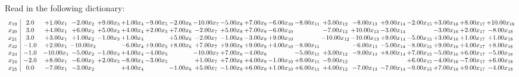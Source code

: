 \documentclass[9pt]{article}
\begin{document}
Read in the following dictionary:
\[\begin{array}{c| c c@{\hskip 2pt} c@{\hskip 2pt} c@{\hskip 2pt} c@{\hskip 2pt} c@{\hskip 2pt} c@{\hskip 2pt} c@{\hskip 2pt} c@{\hskip 2pt} c@{\hskip 2pt} c@{\hskip 2pt} c@{\hskip 2pt} c@{\hskip 2pt} c@{\hskip 2pt} c@{\hskip 2pt} c@{\hskip 2pt} c@{\hskip 2pt} c@{\hskip 2pt} c@{\hskip 2pt} }
 x_{19}   &  2.0 & +  1.00 x_{1} & -2.00 x_{2} & +  9.00 x_{3} & +  1.00 x_{4} & -9.00 x_{5} & -2.00 x_{6} & -10.00 x_{7} & -5.00 x_{8} & +  7.00 x_{9} & -6.00 x_{10} & -8.00 x_{11} & +  3.00 x_{12} & -8.00 x_{13} & +  9.00 x_{14} & -2.00 x_{15} & +  3.00 x_{16} & +  8.00 x_{17} & + 10.00 x_{18}\\
 x_{20}   &  3.0 & +  4.00 x_{1} & +  6.00 x_{2} & +  5.00 x_{3} & +  4.00 x_{4} & +  2.00 x_{5} & +  7.00 x_{6} & -2.00 x_{7} & +  5.00 x_{8} & +  7.00 x_{9} & -6.00 x_{10} &   & -7.00 x_{12} & + 10.00 x_{13} & -3.00 x_{14} &   & -3.00 x_{16} & +  2.00 x_{17} & -8.00 x_{18}\\
 x_{21}   &  3.0 & +  3.00 x_{1} & +  1.00 x_{2} & -1.00 x_{3} & +  1.00 x_{4} &   & +  5.00 x_{6} & -2.00 x_{7} & -1.00 x_{8} & -3.00 x_{9} & +  9.00 x_{10} &   & -10.00 x_{12} & -10.00 x_{13} & +  9.00 x_{14} & -5.00 x_{15} & +  3.00 x_{16} & +  1.00 x_{17} & +  1.00 x_{18}\\
 x_{22}   &  -1.0 & +  2.00 x_{1} & -10.00 x_{2} &   & -6.00 x_{4} & +  9.00 x_{5} & +  8.00 x_{6} & +  7.00 x_{7} & +  9.00 x_{8} & +  9.00 x_{9} & +  4.00 x_{10} & -8.00 x_{11} &   & -6.00 x_{13} & -5.00 x_{14} & -8.00 x_{15} & +  9.00 x_{16} & +  4.00 x_{17} & +  8.00 x_{18}\\
 x_{23}   &  -1.0 & -10.00 x_{1} & -5.00 x_{2} & -1.00 x_{3} & +  4.00 x_{4} & -4.00 x_{5} &   & -10.00 x_{7} & +  7.00 x_{8} & -4.00 x_{9} &   & -5.00 x_{11} & +  3.00 x_{12} & -9.00 x_{13} & +  8.00 x_{14} & +  7.00 x_{15} & -5.00 x_{16} & +  6.00 x_{17} & -5.00 x_{18}\\
 x_{24}   &  -2.0 & +  8.00 x_{1} & -6.00 x_{2} & +  2.00 x_{3} & -8.00 x_{4} & -3.00 x_{5} &   & +  1.00 x_{7} & +  7.00 x_{8} & +  4.00 x_{9} & -1.00 x_{10} & +  9.00 x_{11} & -9.00 x_{12} &    &   & +  6.00 x_{15} & -4.00 x_{16} & -7.00 x_{17} & +  6.00 x_{18}\\
 x_{25}   &  0.0 & -7.00 x_{1} & -3.00 x_{2} &   & +  4.00 x_{4} &   & -1.00 x_{6} & +  5.00 x_{7} & -1.00 x_{8} & +  6.00 x_{9} & +  1.00 x_{10} & +  6.00 x_{11} & +  4.00 x_{12} & -7.00 x_{13} & -7.00 x_{14} & -9.00 x_{15} & +  7.00 x_{16} & +  9.00 x_{17} & -4.00 x_{18}\\

\end{array}\]
\end{document}

